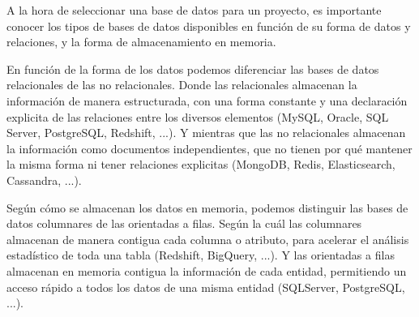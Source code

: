 
A la hora de seleccionar una base de datos para un proyecto, es importante conocer los tipos de bases de datos disponibles en función de su forma de datos y relaciones, y la forma de almacenamiento en memoria.

En función de la forma de los datos podemos diferenciar las bases de datos relacionales de las no relacionales. Donde las relacionales almacenan la información de manera estructurada, con una forma constante y una declaración explicita de las relaciones entre los diversos elementos (MySQL, Oracle, SQL Server, PostgreSQL, Redshift, ...). Y mientras que las no relacionales almacenan la información como documentos independientes, que no tienen por qué mantener la misma forma ni tener relaciones explicitas (MongoDB, Redis, Elasticsearch, Cassandra, ...).

Según cómo se almacenan los datos en memoria, podemos distinguir las bases de datos columnares de las orientadas a filas. Según la cuál las columnares almacenan de manera contigua cada columna o atributo, para acelerar el análisis estadístico de toda una tabla (Redshift, BigQuery, ...). Y las orientadas a filas almacenan en memoria contigua la información de cada entidad, permitiendo un acceso rápido a todos los datos de una misma entidad (SQLServer, PostgreSQL, ...).

